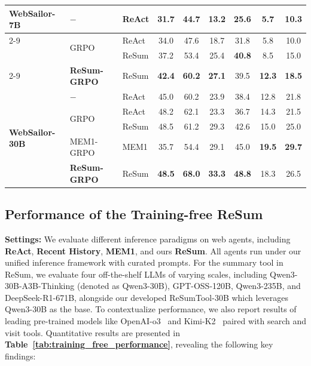 \begin{table}[!t]
{\begin{tabular}{lll|cc|cc|cc}
        \multirow{5}{*}{\textbf{WebSailor-7B}}
        & $-$ & ReAct & 31.7 & 44.7 & 13.2 & 25.6 & 5.7 & 10.3 \\  \cmidrule{2-9}
        & \multirow{2}{*}{GRPO} & ReAct & 34.0 & 47.6 & 18.7 & 31.8 & 5.8 & 10.0 \\
        & & ReSum & 37.2 & 53.4 & 25.4 & \textbf{40.8} & 8.5 & 15.0\\ \cmidrule{2-9}
        & \cellcolor{blue!10} \textbf{ReSum-GRPO} &
        \cellcolor{blue!10}ReSum & \cellcolor{blue!10}\textbf{42.4} & \cellcolor{blue!10}\textbf{60.2} & \cellcolor{blue!10}\textbf{27.1} & \cellcolor{blue!10}39.5 & \cellcolor{blue!10}\textbf{12.3} & \cellcolor{blue!10}\textbf{18.5} \\ \midrule

        \multirow{6}{*}{\textbf{WebSailor-30B}}
        & $-$ & ReAct & 45.0 & 60.2 & 23.9 & 38.4 & 12.8 & 21.8 \\  \cmidrule{2-9}
        & \multirow{2}{*}{GRPO} & ReAct & 48.2 & 62.1 & 23.3 & 36.7 & 14.3 & 21.5 \\ 
        & & ReSum & 48.5 & 61.2 & 29.3 & 42.6 & 15.0 & 25.0 \\ \cmidrule{2-9}
        & MEM1-GRPO & MEM1 & 35.7 & 54.4 & 29.1 & 45.0 & \textbf{19.5} & \textbf{29.7} \\ \cmidrule{2-9}
        & \cellcolor{blue!10} \textbf{ReSum-GRPO} & \cellcolor{blue!10}ReSum & \cellcolor{blue!10}\textbf{48.5} & \cellcolor{blue!10}\textbf{68.0} & \cellcolor{blue!10}\textbf{33.3} & \cellcolor{blue!10}\textbf{48.8} & \cellcolor{blue!10}18.3 & \cellcolor{blue!10}26.5 \\ 
       \bottomrule
    \end{tabular}
    }
    \label{tab:rl_performance}
\end{table}



\subsection{Performance of the Training-free ReSum}
\textbf{Settings:} We evaluate different inference paradigms on web agents, including \textbf{ReAct}, \textbf{Recent History}, \textbf{MEM1}, and ours \textbf{ReSum}. All agents run under our unified inference framework with curated prompts. For the summary tool in ReSum, we evaluate four off-the-shelf LLMs of varying scales, including Qwen3-30B-A3B-Thinking (denoted as Qwen3-30B), GPT-OSS-120B, Qwen3-235B, and DeepSeek-R1-671B, alongside our developed ReSumTool-30B which leverages Qwen3-30B as the base. To contextualize performance, we also report results of leading pre-trained models like OpenAI-o3~\citep{o3} and Kimi-K2~\citep{kimiteam2025kimik2openagentic} paired with search and visit tools. Quantitative results are presented in \textbf{Table~\ref{tab:training_free_performance}}, revealing the following key findings:

